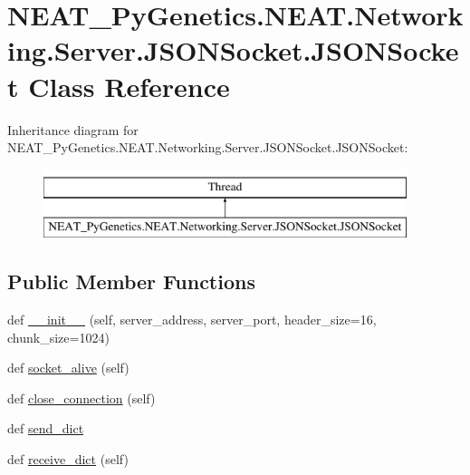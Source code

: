 \hypertarget{classNEAT__PyGenetics_1_1NEAT_1_1Networking_1_1Server_1_1JSONSocket_1_1JSONSocket}{}\section{N\+E\+A\+T\+\_\+\+Py\+Genetics.\+N\+E\+A\+T.\+Networking.\+Server.\+J\+S\+O\+N\+Socket.\+J\+S\+O\+N\+Socket Class Reference}
\label{classNEAT__PyGenetics_1_1NEAT_1_1Networking_1_1Server_1_1JSONSocket_1_1JSONSocket}
Inheritance diagram for N\+E\+A\+T\+\_\+\+Py\+Genetics.\+N\+E\+A\+T.\+Networking.\+Server.\+J\+S\+O\+N\+Socket.\+J\+S\+O\+N\+Socket\+:\begin{figure}[H]
\begin{center}
\leavevmode
\includegraphics[height=2.000000cm]{classNEAT__PyGenetics_1_1NEAT_1_1Networking_1_1Server_1_1JSONSocket_1_1JSONSocket}
\end{center}
\end{figure}
\subsection*{Public Member Functions}
\begin{DoxyCompactItemize}
\item 
def \hyperlink{classNEAT__PyGenetics_1_1NEAT_1_1Networking_1_1Server_1_1JSONSocket_1_1JSONSocket_a95dd555e4124ce36a47d00e3b62b597a}{\+\_\+\+\_\+init\+\_\+\+\_\+} (self, server\+\_\+address, server\+\_\+port, header\+\_\+size=16, chunk\+\_\+size=1024)
\item 
def \hyperlink{classNEAT__PyGenetics_1_1NEAT_1_1Networking_1_1Server_1_1JSONSocket_1_1JSONSocket_a05c99b2b4e7b4552155560f5fad0b939}{socket\+\_\+alive} (self)
\item 
def \hyperlink{classNEAT__PyGenetics_1_1NEAT_1_1Networking_1_1Server_1_1JSONSocket_1_1JSONSocket_a196c88e61cbc698f1012a5561f85f6d0}{close\+\_\+connection} (self)
\item 
def \hyperlink{classNEAT__PyGenetics_1_1NEAT_1_1Networking_1_1Server_1_1JSONSocket_1_1JSONSocket_a104209f938a7b47d91692face1dc0569}{send\+\_\+dict}
\item 
def \hyperlink{classNEAT__PyGenetics_1_1NEAT_1_1Networking_1_1Server_1_1JSONSocket_1_1JSONSocket_a2bc8b4e45a2e94d386c98caba0ecce14}{receive\+\_\+dict} (self)
\end{DoxyCompactItemize}


